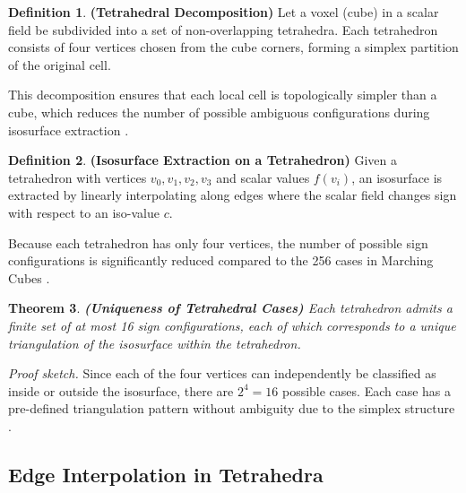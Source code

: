 \documentclass[12pt, a4paper, oneside]{book}
\theoremstyle{plain}
\newtheorem{theorem}{Theorem}[chapter]
\theoremstyle{definition}
\newtheorem{definition}[theorem]{Definition}
\theoremstyle{remark}
\theoremstyle{definition}
\begin{document}
\vspace{0.5em}

\begin{definition}
    \textbf{(Tetrahedral Decomposition)}
Let a voxel (cube) in a scalar field be subdivided into a set of non-overlapping tetrahedra. Each tetrahedron consists of four vertices chosen from the cube corners, forming a simplex partition of the original cell.
\end{definition}


This decomposition ensures that each local cell is topologically simpler than a cube, which reduces the number of possible ambiguous configurations during isosurface extraction \cite{shirley1990marching,bloomenthal1997introduction}.

\vspace{0.5em}

\begin{definition}
    \textbf{(Isosurface Extraction on a Tetrahedron)}
Given a tetrahedron with vertices $v_0, v_1, v_2, v_3$ and scalar values $f(v_i)$, an isosurface is extracted by linearly interpolating along edges where the scalar field changes sign with respect to an iso-value $c$.
\end{definition}


Because each tetrahedron has only four vertices, the number of possible sign configurations is significantly reduced compared to the 256 cases in Marching Cubes \cite{shirley1990marching}.

\vspace{0.5em}

\begin{theorem}
    \textbf{(Uniqueness of Tetrahedral Cases)}
Each tetrahedron admits a finite set of at most 16 sign configurations, each of which corresponds to a unique triangulation of the isosurface within the tetrahedron.

\end{theorem}

\textit{Proof sketch.} Since each of the four vertices can independently be classified as inside or outside the isosurface, there are $2^4 = 16$ possible cases. Each case has a pre-defined triangulation pattern without ambiguity due to the simplex structure \cite{treece1999regularised}.

\vspace{0.5em}

\subsection{Edge Interpolation in Tetrahedra}
\end{document}
